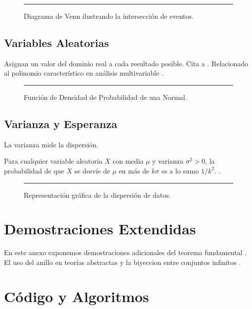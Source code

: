 	\begin{figure}[h]
		\centering
		\rule{5cm}{3cm}
		\caption{Diagrama de Venn ilustrando la intersección de eventos.}
	\end{figure}
	
	\section{Variables Aleatorias}
	Asignan un valor del \gls{dominio} real a cada resultado posible. Cita a \cite{hogg}. Relacionado al \gls{polinomio} característico en análisis multivariable \cite{herstein, stewart}.
	
	\begin{figure}[h]
		\centering
		\rule{5cm}{3cm}
		\caption{Función de Densidad de Probabilidad de una Normal.}
	\end{figure}
	
	\section{Varianza y Esperanza}
	La \gls{varianza} mide la dispersión. 
	
	\begin{theorem}
		Para cualquier variable aleatoria $X$ con media $\mu$ y varianza $\sigma^2 > 0$, la probabilidad de que $X$ se desvíe de $\mu$ en más de $k\sigma$ es a lo sumo $1/k^2$. \cite{ross, spivak, strang}.
	\end{theorem}
	
	\begin{figure}[h]
		\centering
		\rule{5cm}{3cm}
		\caption{Representación gráfica de la dispersión de datos.}
	\end{figure}
	
	\appendix
	
	\chapter{Demostraciones Extendidas}
	
	En este anexo exponemos demostraciones adicionales del \gls{teorema} fundamental \cite{apostol}. El uso del \gls{anillo} en teorías abstractas y la \gls{biyeccion} entre conjuntos infinitos \cite{rudin}.
	
	\chapter{Código y Algoritmos}
	
